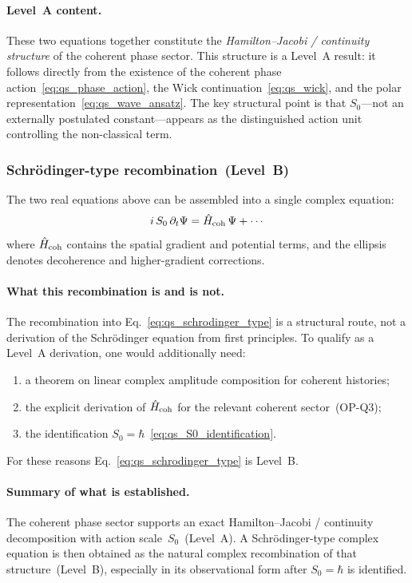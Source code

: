 \paragraph{Level~A content.}
These two equations together constitute the
\emph{Hamilton--Jacobi / continuity structure} of the coherent phase
sector.
This structure is a Level~A result: it follows directly from the
existence of the coherent phase action~\eqref{eq:qs_phase_action},
the Wick continuation~\eqref{eq:qs_wick}, and the polar
representation~\eqref{eq:qs_wave_ansatz}.
The key structural point is that $S_0$---not an externally postulated
constant---appears as the distinguished action unit controlling the
non-classical term.

\subsubsection*{Schr\"odinger-type recombination~(Level~B)}

The two real equations above can be assembled into a single complex
equation:
\begin{equation}
  \label{eq:qs_schrodinger_type}
  i\,S_0\,\partial_t\Psi
  =
  \hat{H}_{\rm coh}\,\Psi
  + \cdots
\end{equation}
where $\hat{H}_{\rm coh}$ contains the spatial gradient and potential
terms, and the ellipsis denotes decoherence and higher-gradient
corrections.

\paragraph{What this recombination is and is not.}
The recombination into Eq.~\eqref{eq:qs_schrodinger_type} is a
structural route, not a derivation of the Schr\"odinger equation
from first principles.
To qualify as a Level~A derivation, one would additionally need:
\begin{enumerate}[label=(\roman*)]
  \item a theorem on linear complex amplitude composition for
    coherent histories;
  \item the explicit derivation of $\hat{H}_{\rm coh}$ for the
    relevant coherent sector~(OP-Q3);
  \item the identification $S_0=\hbar$~\eqref{eq:qs_S0_identification}.
\end{enumerate}
For these reasons Eq.~\eqref{eq:qs_schrodinger_type} is Level~B.

\paragraph{Summary of what is established.}
The coherent phase sector supports an exact Hamilton--Jacobi /
continuity decomposition with action scale~$S_0$~(Level~A).
A Schr\"odinger-type complex equation is then obtained as the
natural complex recombination of that structure~(Level~B), especially
in its observational form after $S_0=\hbar$ is identified.

